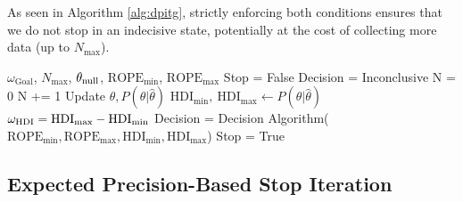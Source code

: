 As seen in Algorithm \ref{alg:dpitg}, strictly enforcing both conditions ensures that we do not stop in an indecisive state, potentially at the cost of collecting more data (up to $N_\mathrm{max}$).

\begin{algorithm}
    \caption{Decisive Precision is the Goal (highlighted: the stopping condition)}\label{alg:dpitg}
    \begin{algorithmic}
    \Require $\omega_\mathrm{Goal}$, $N_\mathrm{max}$, $\theta_{\rm null}$, $\mathrm{ROPE}_\mathrm{min}$, $\mathrm{ROPE}_\mathrm{max}$
    \State Stop = False
    \State Decision = Inconclusive
    \State N = 0
    \State N += 1 
    \State Update $\hat\theta, P(\theta|\hat\theta)$ 
    \State $\mathrm{HDI}_\mathrm{min}, \ \mathrm{HDI}_\mathrm{max}  \gets P(\theta|\hat\theta)$ 
    \State $\omega_{\rm HDI} = \mathrm{HDI}_\mathrm{max} - \mathrm{HDI}_\mathrm{min}$
        \State Decision = Decision Algorithm($\mathrm{ROPE}_\mathrm{min}, \mathrm{ROPE}_\mathrm{max}, \mathrm{HDI}_\mathrm{min}, \mathrm{HDI}_\mathrm{max}$) 
            \State \HiLi Stop = True 
        \EndIf
    \EndIf
    \EndWhile
    \end{algorithmic}
\end{algorithm}

\subsection{Expected Precision-Based Stop Iteration}\label{sec:expected_stop_iteration}


